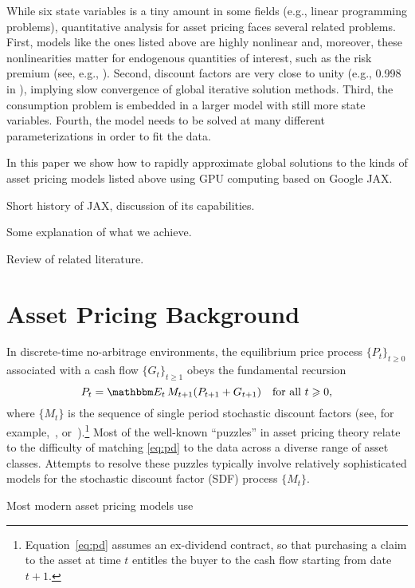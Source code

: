 \documentclass[12pt, reqno]{amsart}
\renewcommand{\geq}{\geqslant}
\newcommand{\1}{\mathbbm 1}
\newcommand{\EE}{\mathbbm E}
\theoremstyle{plain}
\theoremstyle{definition}
\begin{document}
While six state variables is a tiny amount in some fields (e.g., linear
programming problems), quantitative analysis for asset pricing faces several
related problems.  First, models like the ones listed above are highly
nonlinear and, moreover, these nonlinearities matter for endogenous quantities
of interest, such as the risk premium (see, e.g., \cite{pohl2018higher}).
Second, discount factors are very close to unity (e.g., 0.998 in
\cite{bansal2004risks}), implying slow convergence of global iterative
solution methods.  Third, the consumption problem is embedded in a larger
model with still more state variables.  Fourth, the model needs to be solved
at many different parameterizations in order to fit the data.

In this paper we show how to rapidly approximate global solutions to the kinds
of asset pricing models listed above using GPU computing based on Google JAX.

Short history of JAX, discussion of its capabilities.

Some explanation of what we achieve.

Review of related literature.


\section{Asset Pricing Background}

In discrete-time no-arbitrage environments, the equilibrium price process
$\{P_t\}_{t \geq 0}$ associated with a cash flow $\{G_t\}_{t \geq 1}$ obeys
the fundamental recursion
%
\begin{equation}
    \label{eq:pd}
    P_t
    = \EE_t \, M_{t+1} ( P_{t+1} + G_{t+1} )
    \quad \text{for all } t \geq 0,
\end{equation}
%
where $\{ M_t\}$ is the sequence of single period stochastic discount factors
(see, for example,~\cite{kreps1981arbitrage}, \cite{hansen_richard:1987}
or~\cite{duffie2001dynamic}).\footnote{Equation~\eqref{eq:pd} assumes an
    ex-dividend contract, so that purchasing a claim to the asset at time $t$
entitles the buyer to the cash flow starting from date $t+1$.}  Most of the
well-known ``puzzles'' in asset pricing theory relate to the difficulty of
matching \eqref{eq:pd} to the data across a diverse range of asset classes.
Attempts to resolve these puzzles typically involve relatively sophisticated
models for the stochastic discount factor (SDF) process $\{ M_t\}$.

Most modern asset pricing models use 
\end{document}
